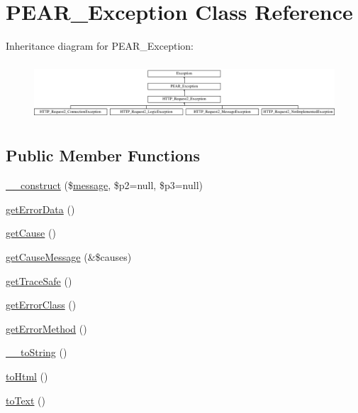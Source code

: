 \hypertarget{classPEAR__Exception}{\section{P\-E\-A\-R\-\_\-\-Exception Class Reference}
\label{classPEAR__Exception}
}
Inheritance diagram for P\-E\-A\-R\-\_\-\-Exception\-:\begin{figure}[H]
\begin{center}
\leavevmode
\includegraphics[height=2.162162cm]{classPEAR__Exception}
\end{center}
\end{figure}
\subsection*{Public Member Functions}
\begin{DoxyCompactItemize}
\item 
\hyperlink{classPEAR__Exception_a7cecb146f11821bcd31ef8317c9a2ce9}{\-\_\-\-\_\-construct} (\$\hyperlink{classmessage}{message}, \$p2=null, \$p3=null)
\item 
\hyperlink{classPEAR__Exception_a705ea5e6f32355245137f979221bf5c2}{get\-Error\-Data} ()
\item 
\hyperlink{classPEAR__Exception_abc2aa18bf5cf14ab29e01d14eed7e041}{get\-Cause} ()
\item 
\hyperlink{classPEAR__Exception_a1c16ee57f4091d424c1bbcd904dda4f4}{get\-Cause\-Message} (\&\$causes)
\item 
\hyperlink{classPEAR__Exception_a6ddfe3065ec2af986b3e3fe267198515}{get\-Trace\-Safe} ()
\item 
\hyperlink{classPEAR__Exception_a747dd232565b7e07ec7ef55e46405f4e}{get\-Error\-Class} ()
\item 
\hyperlink{classPEAR__Exception_a423d0dcd3d908d2a39068a0893d17f22}{get\-Error\-Method} ()
\item 
\hyperlink{classPEAR__Exception_ab02a3b6f2be2f5b639cba45b007f7b7a}{\-\_\-\-\_\-to\-String} ()
\item 
\hyperlink{classPEAR__Exception_ab69d689242e40974b2675cf25aa68068}{to\-Html} ()
\item 
\hyperlink{classPEAR__Exception_ad3b5a0285226613b02b1730b2d632bd1}{to\-Text} ()
\end{DoxyCompactItemize}

